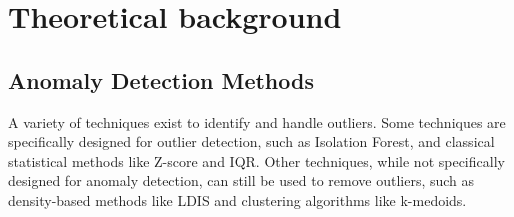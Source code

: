 \documentclass{ws-ijitdm}
\begin{document}
\section{Theoretical background} \label{sec:outliers_method}

\subsection{Anomaly Detection Methods} 


A variety of techniques exist to identify and handle outliers. Some techniques are specifically designed for outlier detection, such as Isolation Forest, and classical statistical methods like Z-score and IQR. Other techniques, while not specifically designed for anomaly detection, can still be used to remove outliers, such as density-based methods like LDIS and clustering algorithms like k-medoids.
\end{document}
